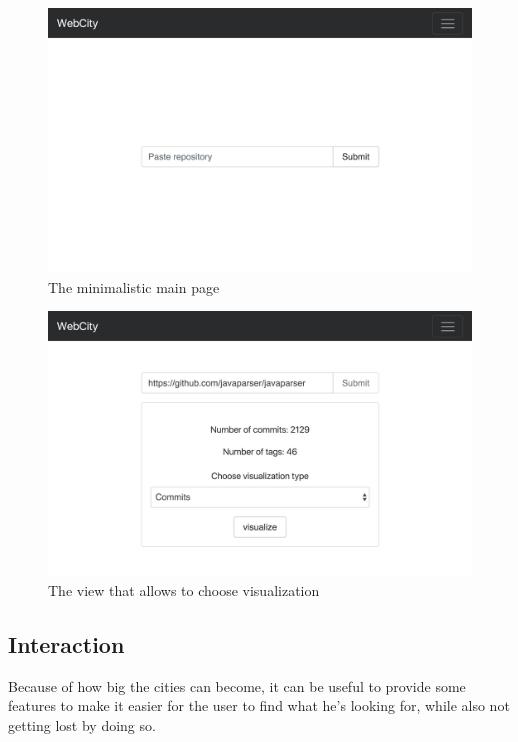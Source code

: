 \documentclass[]{usiinfbachelorproject}
\begin{document}

\begin{figure}[H]
\centering
  \includegraphics[width=.6\textwidth]{pictures/interface.png}
  \caption{The minimalistic main page}
  \label{fig:interface}
\end{figure}

\begin{figure}[H]
    \centering
  \includegraphics[width=.6\textwidth]{pictures/interface2.png}
  \caption{The view that allows to choose visualization}
  \label{fig:interface2}
\end{figure}

\subsection{Interaction} \label{Interaction}
Because of how big the cities can become, it can be useful to provide some features to make it easier for the user to find what he's looking for, while also not getting lost by doing so.
\end{document}
